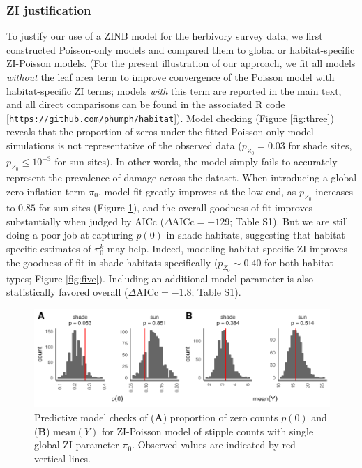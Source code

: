 \documentclass[11pt, oneside]{amsart}
\newcommand{\lib}[1]{\texttt{#1}}
\begin{document}
\subsubsection{ZI justification}

To justify our use of a ZINB model for the herbivory survey data, we first constructed Poisson-only models and compared them to global or habitat-specific ZI-Poisson models. (For the present illustration of our approach, we fit all models \emph{without} the leaf area term to improve convergence of the Poisson model with habitat-specific ZI terms; models \emph{with} this term are reported in the main text, and all direct comparisons can be found in the associated R code [\lib{https://github.com/phumph/habitat}]). Model checking (Figure \ref{fig:three}) reveals that the proportion of zeros under the fitted Poisson-only model simulations is not representative of the observed data ($p_{Z_0} = 0.03$ for shade sites, $p_{Z_0} \leq 10^{-3}$ for sun sites). In other words, the model simply fails to accurately represent the prevalence of damage across the dataset. When introducing a global zero-inflation term $\pi_0$, model fit greatly improves at the low end, as $p_{Z_0}$ increases to $0.85$ for sun sites (Figure \ref{fig:four}), and the overall goodness-of-fit improves substantially when judged by AICc ($\Delta\text{AICc} = -129$; Table S1). But we are still doing a poor job at capturing $p(0)$ in shade habitats, suggesting that habitat-specific estimates of $\pi^k_0$ may help. Indeed, modeling habitat-specific ZI improves the goodness-of-fit in shade habitats specifically ($p_{Z_0} \sim 0.40$ for both habitat types; Figure \ref{fig:five}). Including an additional model parameter is also statistically favored overall ($\Delta\text{AICc} = -1.8$; Table S1).

\begin{figure}[!htbp]
\begin{center}
\includegraphics[scale = 0.8]{POIS_stip1_pp}
\caption{Predictive model checks of (\textbf{A}) proportion of zero counts $p(0)$ and (\textbf{B}) $\text{mean}(Y)$ for ZI-Poisson model of stipple counts with single global ZI parameter $\pi_0$. Observed values are indicated by red vertical lines.}
\label{fig:four}
\end{center}
\end{figure}
\end{document}
